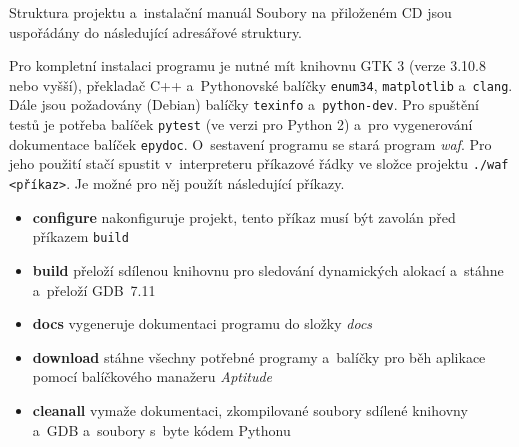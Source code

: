 \documentclass[czech,bachelor,male,python,dept460,hidelinks]{diploma}						%
\newcommand{\parspace}[1][]{
	\ifthenelse{\isempty{#1}}{\vspace{0mm}}{\vspace{#1}}
	\par
}
\begin{document}
\appendix
\begin{section}{Struktura projektu a~instalační manuál}
\label{appendix:manual}
	Soubory na přiloženém CD jsou uspořádány do následující adresářové struktury.
	
	\vspace{5mm}
	
	
	\vspace{5mm}
	
	\parspace Pro kompletní instalaci programu je nutné mít knihovnu GTK 3 (verze 3.10.8 nebo vyšší), překladač C++ a~Pythonovské balíčky \texttt{enum34},
	\texttt{matplotlib} a~\texttt{clang}. Dále jsou požadovány (Debian) balíčky \texttt{texinfo} a~\texttt{python-dev}.
	Pro spuštění testů je potřeba balíček \texttt{pytest} (ve verzi pro Python 2)
	a~pro vygenerování dokumentace balíček \texttt{epydoc}. O~sestavení programu se stará program \textit{waf}. Pro jeho použití stačí spustit v~interpreteru
	příkazové řádky ve složce projektu \texttt{./waf <příkaz>}. Je možné pro něj použít následující příkazy.
	
	\begin{itemize}
		\item \textbf{configure} nakonfiguruje projekt, tento příkaz musí být zavolán před příkazem \texttt{build}
		\item \textbf{build} přeloží sdílenou knihovnu pro sledování dynamických alokací a~stáhne a~přeloží \mbox{GDB 7.11}
		\item \textbf{docs} vygeneruje dokumentaci programu do složky \textit{docs}
		\item \textbf{download} stáhne všechny potřebné programy a~balíčky pro běh aplikace pomocí balíčkového manažeru \textit{Aptitude}
		\item \textbf{cleanall} vymaže dokumentaci, zkompilované soubory sdílené knihovny a~GDB a~soubory s~byte kódem Pythonu
	\end{itemize}
	

\end{section}
\end{document}
